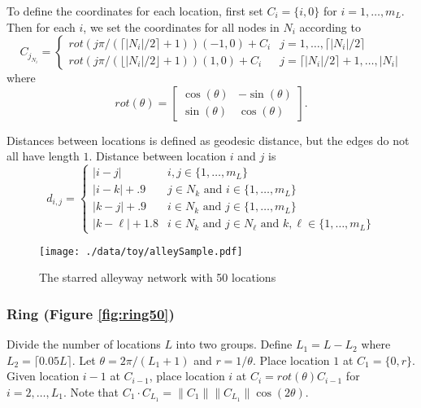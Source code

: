 \documentclass[11pt]{article}
\begin{document}
To define the coordinates for each location, first set $C_{i} =
    \lbrace i,0 \rbrace$ for $i = 1,\ldots,m_L$.  Then for each $i$,
we set the coordinates for all nodes in $N_i$ according to
\begin{equation*}
  C_{j_{N_i}} = 
  \begin{cases}
    rot(j\pi/(\lceil |N_i|/2 \rceil + 1)) (-1,0) + C_i & j = 1,\ldots,
    \lceil |N_i|/2 \rceil\\
    rot(j\pi/(\lfloor |N_i|/2 \rfloor + 1)) (1,0) + C_i & j = \lceil
    |N_i|/2 \rceil + 1,\ldots,|N_i|
  \end{cases}  
\end{equation*}
where
\begin{equation*}
rot(\theta) = \left[
\begin{matrix}
\cos(\theta) & -\sin(\theta)\\
\sin(\theta) & \cos(\theta)
\end{matrix}
\right].
\end{equation*}

Distances between locations is defined as geodesic distance, but
the edges do not all have length $1$.  Distance between location
$i$ and $j$ is
\begin{equation*}
  d_{i,j} = 
  \begin{cases}
    | i - j | & i,j \in \lbrace 1,\ldots,m_L \rbrace\\
    | i - k | + .9 & j \in N_k \text{ and } i \in \lbrace 1,\ldots,m_L
    \rbrace\\
    | k - j | + .9 & i \in N_k \text{ and } j \in \lbrace 1,\ldots,m_L
    \rbrace\\
    | k - \ell| + 1.8 & i \in N_k \text{ and } j \in N_\ell \text{ and
      } k,\ell \in \lbrace 1,\ldots,m_L \rbrace
  \end{cases}
\end{equation*}


\begin{figure}[htb]
\centering
\texttt{[image: ./data/toy/alleySample.pdf]}
\caption{\label{fig:alley50}The starred alleyway network with 50 locations}
\end{figure}



\subsubsection{Ring (Figure \ref{fig:ring50})}
\label{sec-3-1-3}

Divide the number of locations $L$ into two groups.  Define $L_1 =
    L - L_2$ where $L_2 = \lceil 0.05L \rceil$.  Let $\theta =
    2\pi/(L_1+1)$ and $r = 1/\theta$.  Place location $1$
at $C_1 = \lbrace 0,r \rbrace$.  Given location $i-1$ at
$C_{i-1}$, place location $i$ at $C_i = rot(\theta) C_{i-1}$ for
$i = 2,\ldots,L_1$.  Note that $C_{1} \cdot C_{L_1} = \|C_{1}\|
    \|C_{L_1}\| \cos(2\theta)$.
\end{document}
